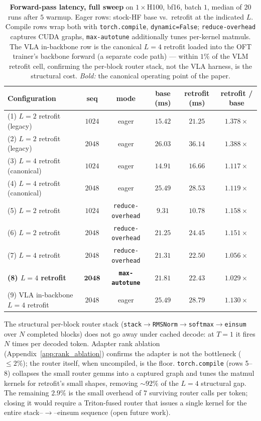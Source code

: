 \documentclass{article}
\begin{document}
\begin{table}[h]
\caption{\textbf{Forward-pass latency, full sweep} on $1{\times}$H100, bf16, batch $1$, median of $20$ runs after $5$ warmup. Eager rows: stock-HF base vs.\ retrofit at the indicated $L$. Compile rows wrap both with \texttt{torch.compile}, \texttt{dynamic=False}; \texttt{reduce-overhead} captures CUDA graphs, \texttt{max-autotune} additionally tunes per-kernel matmuls. The VLA in-backbone row is the canonical $L{=}4$ retrofit loaded into the OFT trainer's backbone forward (a separate code path) — within $1\%$ of the VLM retrofit cell, confirming the per-block router stack, not the VLA harness, is the structural cost. \emph{Bold:} the canonical operating point of the paper.}
\label{tab:retrofit_latency_full}
\centering\small
\setlength{\tabcolsep}{4pt}
\begin{tabular}{lccccc}
\toprule
Configuration & seq & mode & base (ms) & retrofit (ms) & retrofit / base \\
\midrule
(1) $L{=}2$ retrofit (legacy)        & $1024$ & eager & $15.42$ & $21.25$ & $1.378\times$ \\
(2) $L{=}2$ retrofit (legacy)        & $2048$ & eager & $26.03$ & $36.14$ & $1.388\times$ \\
(3) $L{=}4$ retrofit (canonical)     & $1024$ & eager & $14.91$ & $16.66$ & $1.117\times$ \\
(4) $L{=}4$ retrofit (canonical)     & $2048$ & eager & $25.49$ & $28.53$ & $1.119\times$ \\
\midrule
(5) $L{=}2$ retrofit                 & $1024$ & \texttt{reduce-overhead}  & $9.31$  & $10.78$ & $1.158\times$ \\
(6) $L{=}2$ retrofit                 & $2048$ & \texttt{reduce-overhead}  & $21.25$ & $24.45$ & $1.151\times$ \\
(7) $L{=}4$ retrofit                 & $2048$ & \texttt{reduce-overhead}  & $21.31$ & $22.50$ & $1.056\times$ \\
\textbf{(8) $L{=}4$ retrofit}        & $\mathbf{2048}$ & \textbf{\texttt{max-autotune}} & $\mathbf{21.81}$ & $\mathbf{22.43}$ & $\mathbf{1.029\times}$ \\
\midrule
(9) VLA in-backbone $L{=}4$ retrofit & $2048$ & eager & $25.49$ & $28.79$ & $1.130\times$ \\
\bottomrule
\end{tabular}
\end{table}

The structural per-block router stack (\texttt{stack}$\to$\texttt{RMSNorm}$\to$\texttt{softmax}$\to$\texttt{einsum} over $N$ completed blocks) does not go away under cached decode: at $T{=}1$ it fires $N$ times per decoded token. Adapter rank ablation (Appendix~\ref{app:rank_ablation}) confirms the adapter is not the bottleneck ($\leq 2\%$); the router itself, when uncompiled, is the floor. \texttt{torch.compile} (rows 5--8) collapses the small router gemms into a captured graph and tunes the matmul kernels for retrofit's small shapes, removing $\sim$$92\%$ of the $L{=}4$ structural gap. The remaining $2.9\%$ is the small overhead of $7$ surviving router calls per token; closing it would require a Triton-fused router that issues a single kernel for the entire stack--$\to$--einsum sequence (open future work).
\end{document}
